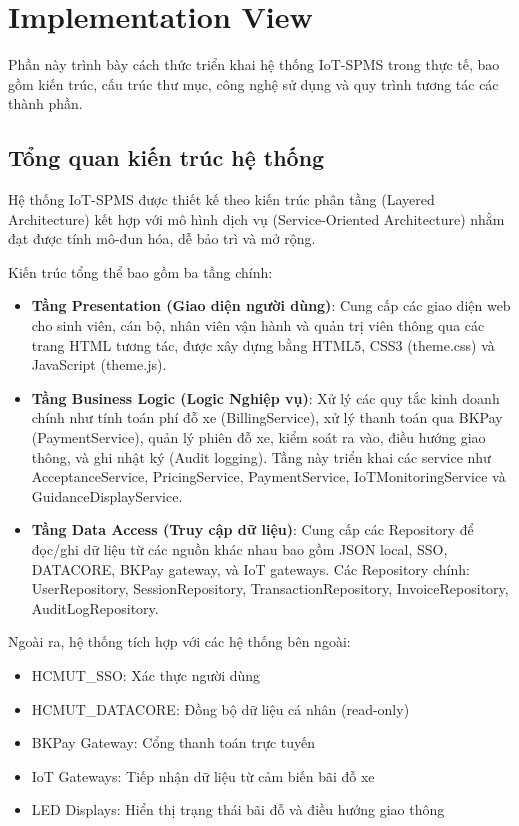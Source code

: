 \newpage
\section{Implementation View}
Phần này trình bày cách thức triển khai hệ thống IoT-SPMS trong thực tế, bao gồm kiến trúc, cấu trúc thư mục, công nghệ sử dụng và quy trình tương tác các thành phần.

\subsection{Tổng quan kiến trúc hệ thống}

Hệ thống IoT-SPMS được thiết kế theo kiến trúc phân tầng (Layered Architecture) kết hợp với mô hình dịch vụ (Service-Oriented Architecture) nhằm đạt được tính mô-đun hóa, dễ bảo trì và mở rộng.

Kiến trúc tổng thể bao gồm ba tầng chính:

\begin{itemize}
    \item \textbf{Tầng Presentation (Giao diện người dùng)}: Cung cấp các giao diện web cho sinh viên, cán bộ, nhân viên vận hành và quản trị viên thông qua các trang HTML tương tác, được xây dựng bằng HTML5, CSS3 (theme.css) và JavaScript (theme.js).
    
    \item \textbf{Tầng Business Logic (Logic Nghiệp vụ)}: Xử lý các quy tắc kinh doanh chính như tính toán phí đỗ xe (BillingService), xử lý thanh toán qua BKPay (PaymentService), quản lý phiên đỗ xe, kiểm soát ra vào, điều hướng giao thông, và ghi nhật ký (Audit logging). Tầng này triển khai các service như AcceptanceService, PricingService, PaymentService, IoTMonitoringService và GuidanceDisplayService.
    
    \item \textbf{Tầng Data Access (Truy cập dữ liệu)}: Cung cấp các Repository để đọc/ghi dữ liệu từ các nguồn khác nhau bao gồm JSON local, SSO, DATACORE, BKPay gateway, và IoT gateways. Các Repository chính: UserRepository, SessionRepository, TransactionRepository, InvoiceRepository, AuditLogRepository.
\end{itemize}

Ngoài ra, hệ thống tích hợp với các hệ thống bên ngoài:
\begin{itemize}
    \item HCMUT\_SSO: Xác thực người dùng
    \item HCMUT\_DATACORE: Đồng bộ dữ liệu cá nhân (read-only)
    \item BKPay Gateway: Cổng thanh toán trực tuyến
    \item IoT Gateways: Tiếp nhận dữ liệu từ cảm biến bãi đỗ xe
    \item LED Displays: Hiển thị trạng thái bãi đỗ và điều hướng giao thông
\end{itemize}

